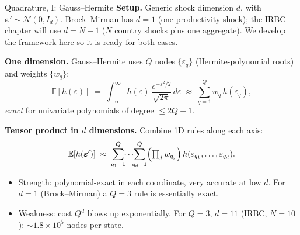 \documentclass[aspectratio=169,11pt]{beamer}
\newcommand{\emphc}[1]{\textcolor{harvardcrimson}{#1}}
\newcommand{\E}[1]{\mathbb{E}\!\left[#1\right]}
\begin{document}
\begin{frame}{Quadrature, I: Gauss--Hermite}
\footnotesize
\textbf{Setup.} Generic shock dimension $d$, with $\bm\varepsilon' \sim \mathcal{N}(0, I_d)$.  Brock--Mirman has $d=1$ (one productivity shock); the IRBC chapter will use $d=N+1$ ($N$ country shocks plus one aggregate).  We develop the framework here so it is ready for both cases.

\vspace{0.3em}
\textbf{One dimension.} Gauss--Hermite uses $Q$ nodes $\{\varepsilon_q\}$ (Hermite-polynomial roots) and weights $\{w_q\}$:
\[
\E{h(\varepsilon)} \;=\; \int_{-\infty}^{\infty} h(\varepsilon)\,\frac{e^{-\varepsilon^2/2}}{\sqrt{2\pi}}\,d\varepsilon \;\approx\; \sum_{q=1}^{Q} w_q\, h(\varepsilon_q),
\]
\emph{exact} for univariate polynomials of degree $\le 2Q-1$.

\vspace{0.3em}
\textbf{Tensor product in $d$ dimensions.} Combine 1D rules along each axis:
\[
\E{h(\bm\varepsilon')} \;\approx\; \sum_{q_1=1}^{Q}\!\!\cdots\!\!\sum_{q_d=1}^{Q} \Bigl(\textstyle\prod_{j} w_{q_j}\Bigr)\, h(\varepsilon_{q_1}, \ldots, \varepsilon_{q_d}).
\]
\vspace{-0.4em}
\begin{itemize}\itemsep1pt
    \item \emphc{Strength:} polynomial-exact in each coordinate, very accurate at low $d$.  For $d=1$ (Brock--Mirman) a $Q=3$ rule is essentially exact.
    \item \emphc{Weakness:} cost $Q^{d}$ blows up exponentially. For $Q=3$, $d=11$ (IRBC, $N=10$): $\sim 1.8\times 10^5$ nodes per state.
\end{itemize}
\end{frame}
\end{document}
